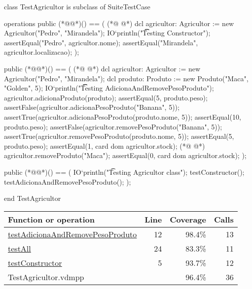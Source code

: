 \begin{vdmpp}[breaklines=true]
class TestAgricultor is subclass of SuiteTestCase
 
operations
  public (*@@*)() == (
(*@
\label{testConstructor:5}
@*)
   dcl agricultor: Agricultor := new Agricultor("Pedro", "Mirandela");
    IO`println("\t\t Testing Constructor");
    assertEqual("Pedro", agricultor.nome);
    assertEqual("Mirandela", agricultor.localizacao);
  );
  
 public (*@@*)() == (
(*@
\label{testAdicionaAndRemovePesoProduto:12}
@*)
  dcl agricultor: Agricultor := new Agricultor("Pedro", "Mirandela");
   dcl produto: Produto := new Produto("Maca", "Golden", 5);
  IO`println("\t\t Testing AdicionaAndRemovePesoProduto");
  agricultor.adicionaProduto(produto);
  assertEqual(5, produto.peso);  
  assertFalse(agricultor.adicionaPesoProduto("Banana", 5));
  assertTrue(agricultor.adicionaPesoProduto(produto.nome, 5));
  assertEqual(10, produto.peso);  
  assertFalse(agricultor.removePesoProduto("Banana", 5));
  assertTrue(agricultor.removePesoProduto(produto.nome, 5));
  assertEqual(5, produto.peso);
  assertEqual(1, card dom agricultor.stock);
(*@
\label{testAll:24}
@*)
  agricultor.removeProduto("Maca"); 
  assertEqual(0, card dom agricultor.stock);
  );
   
  public (*@@*)() == (
    IO`println("\t Testing Agricultor class");
    testConstructor();
    testAdicionaAndRemovePesoProduto();
  );

end TestAgricultor
\end{vdmpp}
\bigskip
\begin{longtable}{|l|r|r|r|}
\hline
Function or operation & Line & Coverage & Calls \\
\hline
\hline
\hyperref[testAdicionaAndRemovePesoProduto:12]{testAdicionaAndRemovePesoProduto} & 12&98.4\% & 13 \\
\hline
\hyperref[testAll:24]{testAll} & 24&83.3\% & 11 \\
\hline
\hyperref[testConstructor:5]{testConstructor} & 5&93.7\% & 12 \\
\hline
\hline
TestAgricultor.vdmpp & & 96.4\% & 36 \\
\hline
\end{longtable}

